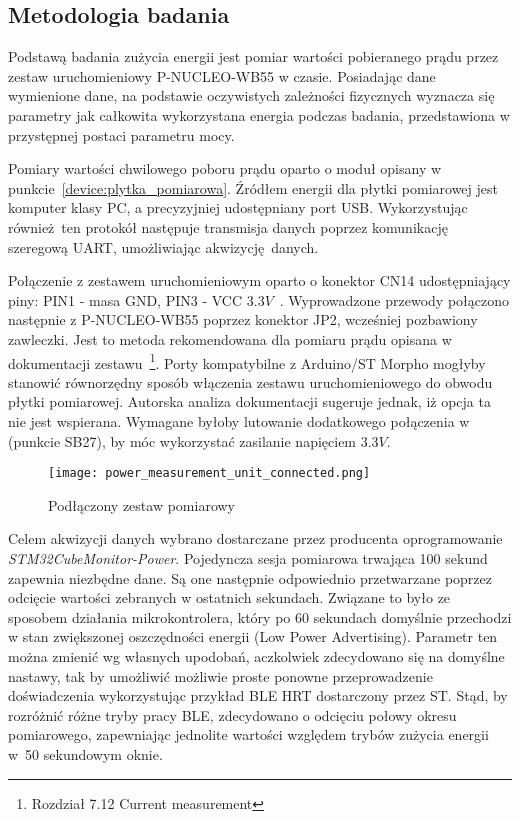 \subsection{Metodologia badania}

Podstawą badania zużycia energii jest pomiar wartości pobieranego prądu przez zestaw uruchomieniowy
P-NUCLEO-WB55 w czasie. Posiadając dane wymienione dane, na podstawie oczywistych
zależności fizycznych wyznacza się parametry jak całkowita wykorzystana energia
podczas badania, przedstawiona w przystępnej postaci parametru mocy.

Pomiary wartości chwilowego poboru prądu oparto o moduł opisany w punkcie~\ref{device:plytka_pomiarowa}.
Źródłem energii dla płytki pomiarowej jest komputer klasy PC, a precyzyjniej udostępniany
port USB. Wykorzystując również ten protokół następuje transmisja danych poprzez komunikację szeregową
UART, umożliwiając akwizycję danych.

Połączenie z zestawem uruchomieniowym oparto o konektor CN14 udostępniający piny: PIN1 - masa GND, PIN3 - VCC $3.3V$~\cite{noauthor_um2243_2018}.
Wyprowadzone przewody połączono następnie z P-NUCLEO-WB55 poprzez konektor JP2, wcześniej pozbawiony zawleczki.
Jest to metoda rekomendowana dla pomiaru prądu opisana w dokumentacji zestawu~\cite{stmicroelectronics_um2435_2019}\footnote{
Rozdział 7.12 Current measurement}. Porty kompatybilne z Arduino/ST Morpho mogłyby stanowić równorzędny sposób
włączenia zestawu uruchomieniowego do obwodu płytki pomiarowej. Autorska analiza dokumentacji sugeruje jednak,
iż opcja ta nie jest wspierana. Wymagane byłoby lutowanie dodatkowego połączenia w (punkcie SB27), by móc wykorzystać
zasilanie napięciem $3.3V$.

\begin{figure}[!htb]
	\centering \texttt{[image: power\_measurement\_unit\_connected.png]}
	\caption{Podłączony zestaw pomiarowy}
	\label{rys:connected_power_measurement_unit}
\end{figure}

Celem akwizycji danych wybrano dostarczane przez producenta oprogramowanie \textit{STM32CubeMonitor-Power}.
Pojedyncza sesja pomiarowa trwająca 100 sekund zapewnia niezbędne dane. Są one następnie
odpowiednio przetwarzane poprzez odcięcie wartości zebranych w ostatnich sekundach. Związane to było
ze sposobem działania mikrokontrolera, który po 60 sekundach domyślnie przechodzi w stan zwiększonej
oszczędności energii (Low Power Advertising). Parametr ten można zmienić wg własnych upodobań, aczkolwiek zdecydowano
się na domyślne nastawy, tak by umożliwić możliwie proste ponowne przeprowadzenie doświadczenia wykorzystując przykład
BLE HRT dostarczony przez ST. Stąd, by rozróżnić różne tryby pracy \gls{BLE}, zdecydowano o odcięciu
połowy okresu pomiarowego, zapewniając jednolite wartości względem trybów zużycia energii
w~50 sekundowym oknie.

